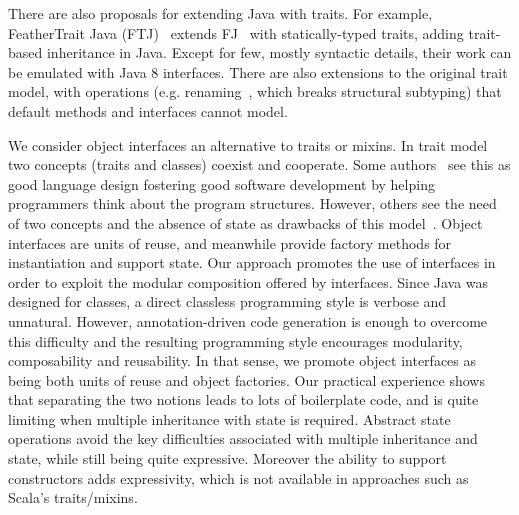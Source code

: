 There are also proposals for extending Java with traits. For
example, FeatherTrait Java (FTJ)~\cite{Liquori08ftj} extends
FJ~\cite{Igarashi01FJ} with statically-typed traits, adding trait-based
inheritance in Java.  Except for few, mostly syntactic details, their work can
be emulated with Java 8 interfaces. There are also extensions to the original
trait model, with operations (e.g. renaming~\cite{reppy2006foundation}, which breaks
structural subtyping) that default methods and interfaces cannot
model.

We consider object interfaces an alternative to traits or mixins. In
trait model two concepts (traits and classes) coexist and cooperate. Some
authors~\cite{BettiniDSS13} see this as good language design fostering good
software development by helping programmers think about the program structures.
However, others see the need of two concepts and the
absence of state as drawbacks of this model~\cite{malayeri2009cz}.  Object
interfaces are units of reuse, and meanwhile provide factory methods
for instantiation and support state. Our approach promotes the use of
interfaces in order to exploit the modular composition
offered by interfaces. Since Java was designed for classes, a direct classless
programming style is verbose and unnatural. However, annotation-driven code
generation is enough to overcome this difficulty and the resulting programming
style encourages modularity, composability and reusability. %
In that sense, we promote object interfaces as being both units of
reuse and object factories. Our practical experience shows that
separating the two notions leads to lots of boilerplate code, and is quite
limiting when multiple inheritance with state is required.  Abstract state
operations avoid the key difficulties associated with multiple inheritance and
state, while still being quite expressive. Moreover the ability to support
constructors adds expressivity, which is not available in approaches
such as Scala's traits/mixins.





